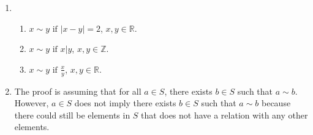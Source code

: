\documentclass{article}
\newtheorem{prop}[thm]{Proposition}
\begin{document}
\begin{enumerate}
\begin{enumerate}
\begin{proof}
        Transitive: Let $((x_1, y_1), (x_2, y_2)), ((x_2, y_2), (x_3, y_3)) \in R$. We have $x_1 + 2y_1 = x_2 + 2y_2 = x_3 + 2y_3$. \\
        Thus, for all $((x_1, y_1), (x_2, y_2)), ((x_2, y_2), (x_3, y_3)) \in R$, $((x_1, y_1), (x_3, y_3)) \in R$, and so $\sim$ is transitive.
    \end{proof}

    \item \begin{prop}
        $\sim$ symmetric and transitive but not reflexive.
    \end{prop}
    \begin{proof}
        Define $R \subseteq \mathbb{R}^2$ by
        \begin{gather}
            (x, y) \in R \text{ if } \frac{x}{y} = 1.
        \end{gather}
        Reflexive: Consider $0 \in \mathbb{R}$. We have $\frac{0}{0}$, which is undefined, and so $\sim$ is not reflexive.

        Symmetric: Let $(x, y) \in R$. Since $\frac{x}{y} = 1$, we know that $x = y$. We then have $\frac{y}{x} = 1$. Thus, for all $(x, y) \in R$, $(y, x) \in R$, and so $\sim$ is symmetric.

        Transitive: Let $(x, y), (y, z) \in R$. Since $\frac{x}{y} = \frac{y}{z} = 1$, we know that $x = y$ and $y = z$, so $x = z$. We then have $\frac{x}{z} = 1$. Thus, for all $(x, y), (y, z) \in R$, $(x, z) \in R$, and so $\sim$ is transitive.
    \end{proof}
\end{enumerate}


\item 
\begin{enumerate}
    \item 
    $x \sim y \text{ if } |x - y| = 2$, $x, y \in \mathbb{R}$.
    \item
    $x \sim y \text{ if } x|y$, $x, y \in \mathbb{Z}$.
    \item
    $x \sim y \text{ if } \frac{x}{y}$, $x, y \in \mathbb{R}$.
\end{enumerate}

\item 
The proof is assuming that for all $a \in S$, there exists $b \in S$ such that $a \sim b$. However, $a \in S$ does not imply there exists $b \in S$ such that $a \sim b$ because there could still be elements in $S$ that does not have a relation with any other elements.
    
\end{enumerate}
\end{document}
